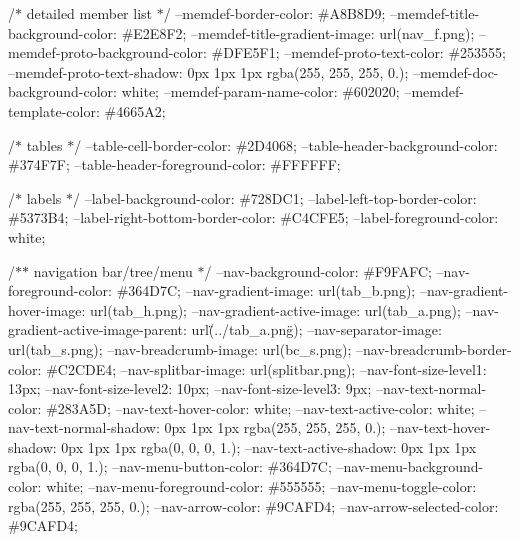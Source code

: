 /\texorpdfstring{$\ast$}{*} detailed member list \texorpdfstring{$\ast$}{*}/ --memdef-\/border-\/color\+: \#\+A8\+B8\+D9; --memdef-\/title-\/background-\/color\+: \#\+E2\+E8\+F2; --memdef-\/title-\/gradient-\/image\+: url(\textquotesingle{}nav\+\_\+f.\+png\textquotesingle{}); --memdef-\/proto-\/background-\/color\+: \#\+DFE5\+F1; --memdef-\/proto-\/text-\/color\+: \#253555; --memdef-\/proto-\/text-\/shadow\+: 0px 1px 1px rgba(255, 255, 255, 0.); --memdef-\/doc-\/background-\/color\+: white; --memdef-\/param-\/name-\/color\+: \#602020; --memdef-\/template-\/color\+: \#4665A2;

/\texorpdfstring{$\ast$}{*} tables \texorpdfstring{$\ast$}{*}/ --table-\/cell-\/border-\/color\+: \#2D4068; --table-\/header-\/background-\/color\+: \#374F7F; --table-\/header-\/foreground-\/color\+: \#\+FFFFFF;

/\texorpdfstring{$\ast$}{*} labels \texorpdfstring{$\ast$}{*}/ --label-\/background-\/color\+: \#728DC1; --label-\/left-\/top-\/border-\/color\+: \#5373B4; --label-\/right-\/bottom-\/border-\/color\+: \#\+C4\+CFE5; --label-\/foreground-\/color\+: white;

/\texorpdfstring{$\ast$}{*}\texorpdfstring{$\ast$}{*} navigation bar/tree/menu \texorpdfstring{$\ast$}{*}/ --nav-\/background-\/color\+: \#\+F9\+FAFC; --nav-\/foreground-\/color\+: \#364D7C; --nav-\/gradient-\/image\+: url(\textquotesingle{}tab\+\_\+b.\+png\textquotesingle{}); --nav-\/gradient-\/hover-\/image\+: url(\textquotesingle{}tab\+\_\+h.\+png\textquotesingle{}); --nav-\/gradient-\/active-\/image\+: url(\textquotesingle{}tab\+\_\+a.\+png\textquotesingle{}); --nav-\/gradient-\/active-\/image-\/parent\+: url(\"{}../tab\+\_\+a.\+png\"{}); --nav-\/separator-\/image\+: url(\textquotesingle{}tab\+\_\+s.\+png\textquotesingle{}); --nav-\/breadcrumb-\/image\+: url(\textquotesingle{}bc\+\_\+s.\+png\textquotesingle{}); --nav-\/breadcrumb-\/border-\/color\+: \#\+C2\+CDE4; --nav-\/splitbar-\/image\+: url(\textquotesingle{}splitbar.\+png\textquotesingle{}); --nav-\/font-\/size-\/level1\+: 13px; --nav-\/font-\/size-\/level2\+: 10px; --nav-\/font-\/size-\/level3\+: 9px; --nav-\/text-\/normal-\/color\+: \#283A5D; --nav-\/text-\/hover-\/color\+: white; --nav-\/text-\/active-\/color\+: white; --nav-\/text-\/normal-\/shadow\+: 0px 1px 1px rgba(255, 255, 255, 0.); --nav-\/text-\/hover-\/shadow\+: 0px 1px 1px rgba(0, 0, 0, 1.); --nav-\/text-\/active-\/shadow\+: 0px 1px 1px rgba(0, 0, 0, 1.); --nav-\/menu-\/button-\/color\+: \#364D7C; --nav-\/menu-\/background-\/color\+: white; --nav-\/menu-\/foreground-\/color\+: \#555555; --nav-\/menu-\/toggle-\/color\+: rgba(255, 255, 255, 0.); --nav-\/arrow-\/color\+: \#9CAFD4; --nav-\/arrow-\/selected-\/color\+: \#9CAFD4;

